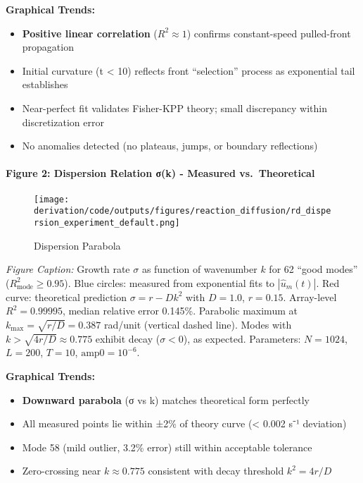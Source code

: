\documentclass[
]{article}
\providecommand{\tightlist}{%
  \setlength{\itemsep}{0pt}\setlength{\parskip}{0pt}}
\begin{document}
\textbf{Graphical Trends:}

\begin{itemize}
\tightlist
\item
  \textbf{Positive linear correlation} (\(R^{2} \approx 1\)) confirms
  constant-speed pulled-front propagation
\item
  Initial curvature (t \textless{} 10) reflects front ``selection''
  process as exponential tail establishes
\item
  Near-perfect fit validates Fisher-KPP theory; small discrepancy within
  discretization error
\item
  No anomalies detected (no plateaus, jumps, or boundary reflections)
\end{itemize}

\hypertarget{figure-2-dispersion-relation-ux3c3k---measured-vs.-theoretical}{%
\paragraph{\texorpdfstring{\textbf{Figure 2: Dispersion Relation σ(k) -
Measured
vs.~Theoretical}}{Figure 2: Dispersion Relation σ(k) - Measured vs.~Theoretical}}\label{figure-2-dispersion-relation-ux3c3k---measured-vs.-theoretical}}

\begin{figure}
\centering
\texttt{[image: derivation/code/outputs/figures/reaction\_diffusion/rd\_dispersion\_experiment\_default.png]}
\caption{Dispersion Parabola}
\end{figure}

\emph{Figure Caption:} Growth rate \(\sigma\) as function of wavenumber
\(k\) for 62 ``good modes'' (\(R^{2}_{\text{mode}} \ge 0.95\)). Blue
circles: measured from exponential fits to \(|\hat u_m(t)|\). Red curve:
theoretical prediction \(\sigma = r - Dk^{2}\) with \(D=1.0\),
\(r=0.15\). Array-level \(R^{2} = 0.99995\), median relative error
0.145\%. Parabolic maximum at \(k_{\max} = \sqrt{r/D} = 0.387\) rad/unit
(vertical dashed line). Modes with \(k > \sqrt{4r/D} \approx 0.775\)
exhibit decay (\(\sigma < 0\)), as expected. Parameters: \(N=1024\),
\(L=200\), \(T=10\), \(\text{amp0}=10^{-6}\).

\textbf{Graphical Trends:}

\begin{itemize}
\tightlist
\item
  \textbf{Downward parabola} (σ vs k) matches theoretical form perfectly
\item
  All measured points lie within ±2\% of theory curve (\textless{} 0.002
  s⁻¹ deviation)
\item
  Mode 58 (mild outlier, 3.2\% error) still within acceptable tolerance
\item
  Zero-crossing near \(k \approx 0.775\) consistent with decay threshold
  \(k^{2} = 4r/D\)
\end{itemize}
\end{document}
